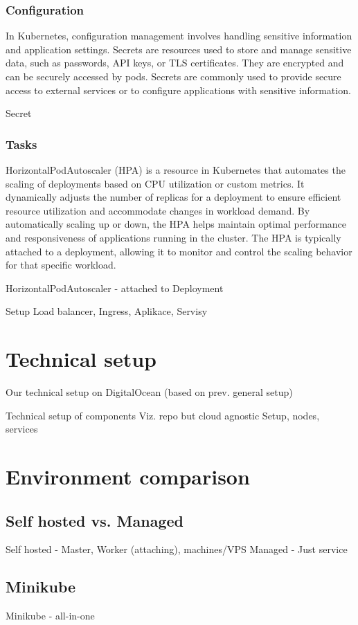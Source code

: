 \documentclass{article}
\begin{document}
\subsubsection*{Configuration}
In Kubernetes, configuration management involves handling sensitive information and application settings. Secrets are resources used to store and manage sensitive data, such as passwords, API keys, or TLS certificates. They are encrypted and can be securely accessed by pods. Secrets are commonly used to provide secure access to external services or to configure applications with sensitive information.

Secret
\subsubsection{Tasks}
HorizontalPodAutoscaler (HPA) is a resource in Kubernetes that automates the scaling of deployments based on CPU utilization or custom metrics. It dynamically adjusts the number of replicas for a deployment to ensure efficient resource utilization and accommodate changes in workload demand. By automatically scaling up or down, the HPA helps maintain optimal performance and responsiveness of applications running in the cluster. The HPA is typically attached to a deployment, allowing it to monitor and control the scaling behavior for that specific workload.

HorizontalPodAutoscaler - attached to Deployment

Setup Load balancer, Ingress, Aplikace, Servisy
\section{Technical setup}
Our technical setup on DigitalOcean (based on prev. general setup) \par
Technical setup of components
Viz. repo but cloud agnostic
Setup, nodes, services
\section{Environment comparison}
\subsection{Self hosted vs. Managed}
Self hosted - Master, Worker (attaching), machines/VPS
Managed - Just service
\subsection{Minikube}
Minikube - all-in-one
\end{document}
